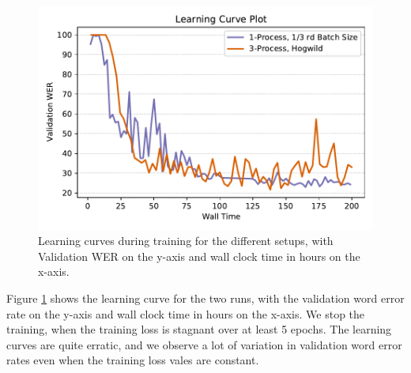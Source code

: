 \begin{figure}[ht]
  \begin{center}
    \includegraphics[width=\textwidth]{images/learning_curve_8000_hogwild.pdf} 
    \caption{Learning curves during training for the different setups, with Validation WER on the y-axis and wall clock time in hours on the x-axis.}
    \label{fig:learningcurve_async}
  \end{center}
\end{figure}

Figure \ref{fig:learningcurve_async} shows the learning curve for the two runs, with the validation word error rate on the y-axis and wall clock time in hours on the x-axis. We stop the training, when the training loss is stagnant over at least 5 epochs. The learning curves are quite erratic, and we observe a lot of variation in validation word error rates even when the training loss vales are constant. 
